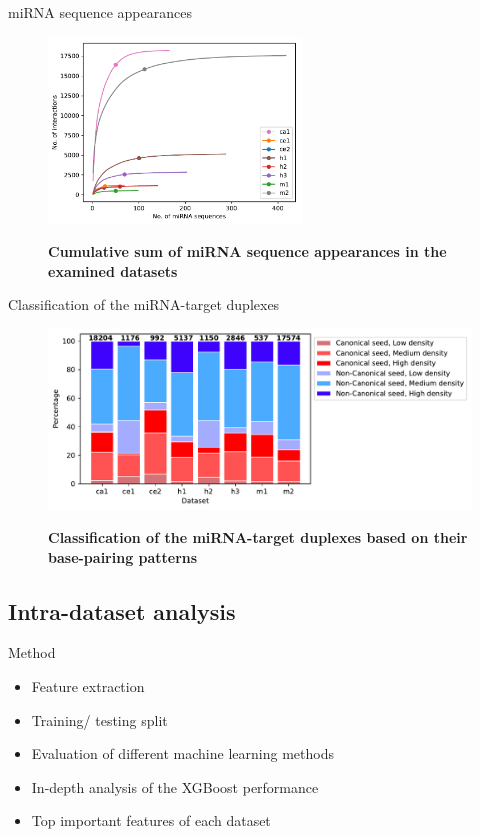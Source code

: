 \documentclass{beamer}
\begin{document}
\begin{frame}{miRNA sequence appearances}
\begin{figure}[h!]
  \caption{\textbf{Cumulative sum of miRNA sequence appearances in the examined datasets}}
      \includegraphics[width=0.6\textwidth]{images/1_mirna_dist.pdf}
      \label{fig:datasetplot}
 
      \end{figure}
\end{frame}

\begin{frame}{Classification of the miRNA-target duplexes}
\begin{figure}[h!]
  \caption{\textbf{Classification of the miRNA-target duplexes based on their base-pairing patterns}} 
    \includegraphics[width = 1\textwidth]{images/2_seed_type_positive2.pdf}
      \label{fig:seed_type_pos}
     
      \end{figure}
\end{frame}
      

\subsection{Intra-dataset analysis}
\begin{frame}{Method}
\begin{itemize}
\item Feature extraction
\item Training/ testing split
\item Evaluation of different machine learning methods
\item In-depth analysis of the XGBoost performance
\item Top important features of each dataset
\end{itemize}
\end{frame}
\end{document}
